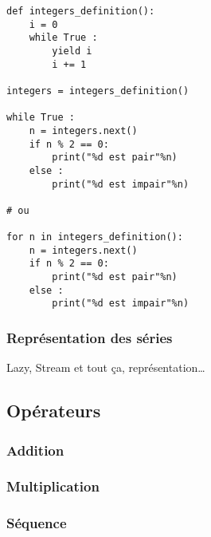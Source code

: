 \documentclass[12pt]{article}
\begin{document}
\noindent\begin{minipage}{\linewidth}
\begin{lstlisting}
def integers_definition():
    i = 0
    while True :
        yield i
        i += 1

integers = integers_definition()

while True :
    n = integers.next()
    if n % 2 == 0:
        print("%d est pair"%n)
    else :
        print("%d est impair"%n)

# ou

for n in integers_definition():
    n = integers.next()
    if n % 2 == 0:
        print("%d est pair"%n)
    else :
        print("%d est impair"%n)
\end{lstlisting}
\end{minipage}


\subsubsection{Représentation des séries}
Lazy, Stream et tout ça, représentation…
\subsection{Opérateurs}
\subsubsection{Addition}
\subsubsection{Multiplication}
\subsubsection{Séquence}




\end{document}
